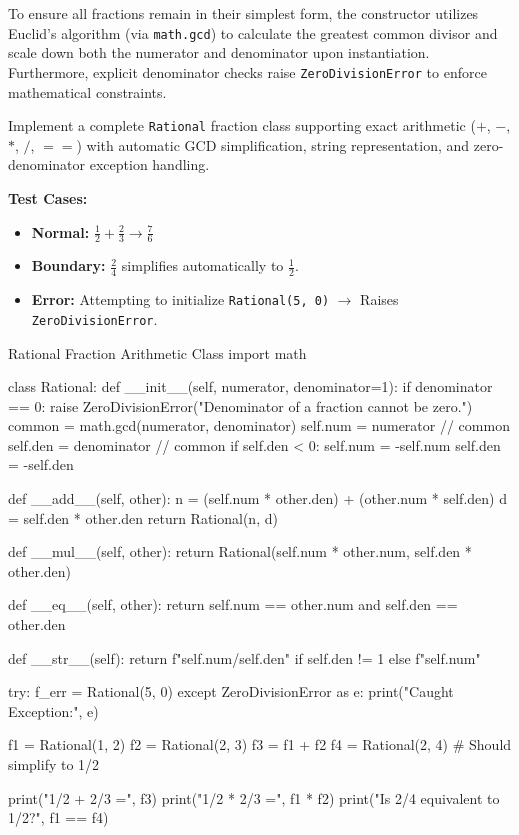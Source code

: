 To ensure all fractions remain in their simplest form, the constructor utilizes Euclid's algorithm (via \texttt{math.gcd}) to calculate the greatest common divisor and scale down both the numerator and denominator upon instantiation. Furthermore, explicit denominator checks raise \texttt{ZeroDivisionError} to enforce mathematical constraints.

\begin{practiceset}
Implement a complete \texttt{Rational} fraction class supporting exact arithmetic ($+$, $-$, $*$, $/$, $==$) with automatic GCD simplification, string representation, and zero-denominator exception handling.

\textbf{Test Cases:}
\begin{itemize}
    \item \textbf{Normal:} $\frac{1}{2} + \frac{2}{3} \rightarrow \frac{7}{6}$
    \item \textbf{Boundary:} $\frac{2}{4}$ simplifies automatically to $\frac{1}{2}$.
    \item \textbf{Error:} Attempting to initialize \texttt{Rational(5, 0)} $\rightarrow$ Raises \texttt{ZeroDivisionError}.
\end{itemize}
\end{practiceset}

\begin{pythoncode}{Rational Fraction Arithmetic Class}
import math

class Rational:
    def __init__(self, numerator, denominator=1):
        if denominator == 0:
            raise ZeroDivisionError("Denominator of a fraction cannot be zero.")
        common = math.gcd(numerator, denominator)
        self.num = numerator // common
        self.den = denominator // common
        if self.den < 0:
            self.num = -self.num
            self.den = -self.den

    def __add__(self, other):
        n = (self.num * other.den) + (other.num * self.den)
        d = self.den * other.den
        return Rational(n, d)

    def __mul__(self, other):
        return Rational(self.num * other.num, self.den * other.den)

    def __eq__(self, other):
        return self.num == other.num and self.den == other.den

    def __str__(self):
        return f"{self.num}/{self.den}" if self.den != 1 else f"{self.num}"

try:
    f_err = Rational(5, 0)
except ZeroDivisionError as e:
    print("Caught Exception:", e)

f1 = Rational(1, 2)
f2 = Rational(2, 3)
f3 = f1 + f2
f4 = Rational(2, 4) # Should simplify to 1/2

print("1/2 + 2/3 =", f3)
print("1/2 * 2/3 =", f1 * f2)
print("Is 2/4 equivalent to 1/2?", f1 == f4)
\end{pythoncode}

